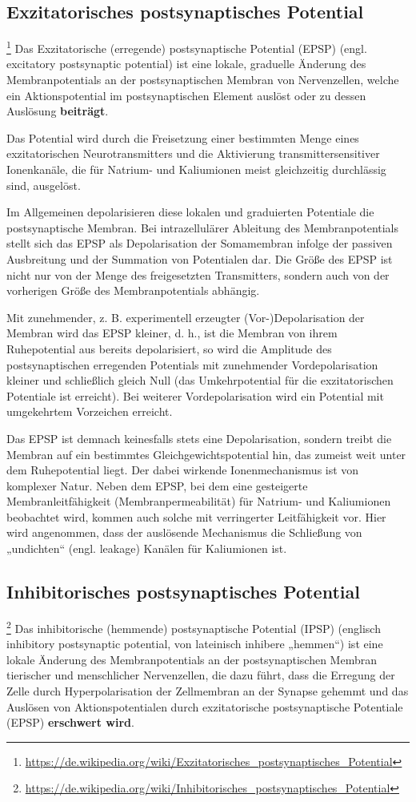 \subsection{Exzitatorisches postsynaptisches Potential}\footnote{\url{https://de.wikipedia.org/wiki/Exzitatorisches_postsynaptisches_Potential}} Das Exzitatorische (erregende) postsynaptische Potential (EPSP) (engl. excitatory postsynaptic potential) ist eine lokale, graduelle Änderung des Membranpotentials an der postsynaptischen Membran von Nervenzellen, welche ein Aktionspotential im postsynaptischen Element auslöst oder zu dessen Auslösung \textbf{beiträgt}.

Das Potential wird durch die Freisetzung einer bestimmten Menge eines exzitatorischen Neurotransmitters und die Aktivierung transmittersensitiver Ionenkanäle, die für Natrium- und Kaliumionen meist gleichzeitig durchlässig sind, ausgelöst.

Im Allgemeinen depolarisieren diese lokalen und graduierten Potentiale die postsynaptische Membran. Bei intrazellulärer Ableitung des Membranpotentials stellt sich das EPSP als Depolarisation der Somamembran infolge der passiven Ausbreitung und der Summation von Potentialen dar. Die Größe des EPSP ist nicht nur von der Menge des freigesetzten Transmitters, sondern auch von der vorherigen Größe des Membranpotentials abhängig.

Mit zunehmender, z. B. experimentell erzeugter (Vor-)Depolarisation der Membran wird das EPSP kleiner, d. h., ist die Membran von ihrem Ruhepotential aus bereits depolarisiert, so wird die Amplitude des postsynaptischen erregenden Potentials mit zunehmender Vordepolarisation kleiner und schließlich gleich Null (das Umkehrpotential für die exzitatorischen Potentiale ist erreicht). Bei weiterer Vordepolarisation wird ein Potential mit umgekehrtem Vorzeichen erreicht.

Das EPSP ist demnach keinesfalls stets eine Depolarisation, sondern treibt die Membran auf ein bestimmtes Gleichgewichtspotential hin, das zumeist weit unter dem Ruhepotential liegt. Der dabei wirkende Ionenmechanismus ist von komplexer Natur. Neben dem EPSP, bei dem eine gesteigerte Membranleitfähigkeit (Membranpermeabilität) für Natrium- und Kaliumionen beobachtet wird, kommen auch solche mit verringerter Leitfähigkeit vor. Hier wird angenommen, dass der auslösende Mechanismus die Schließung von „undichten“ (engl. leakage) Kanälen für Kaliumionen ist.

\subsection{Inhibitorisches postsynaptisches Potential}\footnote{\url{https://de.wikipedia.org/wiki/Inhibitorisches_postsynaptisches_Potential}} Das inhibitorische (hemmende) postsynaptische Potential (IPSP) (englisch inhibitory postsynaptic potential, von lateinisch inhibere „hemmen“) ist eine lokale Änderung des Membranpotentials an der postsynaptischen Membran tierischer und menschlicher Nervenzellen, die dazu führt, dass die Erregung der Zelle durch Hyperpolarisation der Zellmembran an der Synapse gehemmt und das Auslösen von Aktionspotentialen durch exzitatorische postsynaptische Potentiale (EPSP) \textbf{erschwert wird}.

